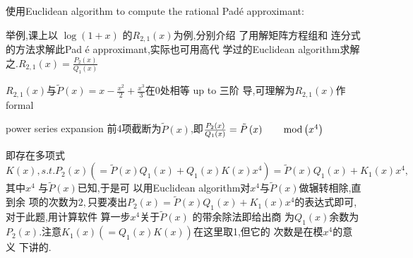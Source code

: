 \documentclass{article}
\begin{document}
使用Euclidean algorithm to compute the rational Pad\'{e}
approximant:

举例,课上以 $\log \left( 1+x\right) $ 的$%
R_{2,1}\left( x\right) $为例,分别介绍%
了用解矩阵方程组和%
连分式的方法求解此Pad%
\'{e} approximant,实际也可用高代%
学过的Euclidean algorithm求解之.$%
R_{2,1}\left( x\right) =\frac{P_{2}\left( x\right) }{Q_{1}\left( x\right) }$

$R_{2,1}\left( x\right) $与$\tilde{P}\left( x\right) =x-\frac{x^{2}}{2}%
+\frac{x^{3}}{3}$在$0$处相等 up to 三阶%
导,可理解为$R_{2,1}\left( x\right) $作
formal

power series expansion 前4项截断为$\tilde{P}%
\left( x\right) $,即$\frac{P_{2}\left( x\right) }{Q_{1}\left( x\right) 
}=\tilde{P}\left( x\right) \qquad \mathop{\rm mod}\left( x^{4}\right) $

即存在多项式$K\left( x\right)
,s.t.P_{2}\left( x\right) (=\tilde{P}\left( x\right) Q_{1}\left( x\right)
+Q_{1}\left( x\right) K\left( x\right) x^{4})=\tilde{P}\left( x\right)
Q_{1}\left( x\right) +K_{1}\left( x\right) x^{4},$其中$x^{4}$%
与$\tilde{P}\left( x\right) $已知,于是可%
以用Euclidean algorithm对$x^{4}$与$\tilde{P}\left(
x\right) $做辗转相除,直到余%
项的次数为$2,$只要凑出$%
P_{2}\left( x\right) =\tilde{P}\left( x\right) Q_{1}\left( x\right)
+K_{1}\left( x\right) x^{4}$的表达式即可,%
对于此题,用计算软件%
算一步$x^{4}$关于$\tilde{P}\left( x\right) $%
的带余除法即给出商%
为$Q_{1}\left( x\right) $余数为$P_{2}\left( x\right)
.$注意$K_{1}\left( x\right) \left( =Q_{1}\left( x\right) K\left(
x\right) \right) $在这里取1,但它的%
次数是在模$x^{4}$的意义%
下讲的.
\end{document}
